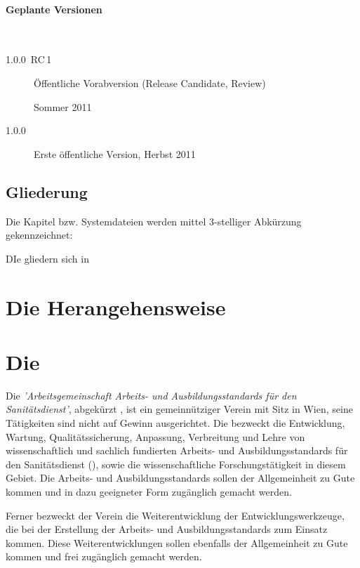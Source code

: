\documentclass[
ngerman,
paper=a4,
asymmetric,
fontsize=10pt,
draft=false,
numbers=noenddot,
bibtotocnumbered,
footnotes=multiple,
toc=flat,
]{scrbook}
\begin{document}
\paragraph{Geplante Versionen}~

\begin{description}
    \item[1.0.0~RC\,1] Öffentliche Vorabversion (Release
    Candidate, Review)
    
    Sommer 2011
    \item[1.0.0] Erste öffentliche Version, Herbst 2011
\end{description}

\subsection{Gliederung}
Die Kapitel bzw. Systemdateien werden mittel 3-stelliger
Abkürzung gekennzeichnet:

DIe {\AASS} gliedern sich in 



\section{Die Herangehensweise}



\section{Die \ARGE}



Die \emph{'Arbeitsgemeinschaft Arbeits- und
    Ausbildungsstandards für den Sanitätsdienst'}, abgekürzt {\ARGE},
    ist ein gemeinnütziger Verein mit Sitz in Wien, seine Tätigkeiten sind nicht
    auf Gewinn ausgerichtet. 
    Die \ARGE{} bezweckt die Entwicklung, Wartung,
    Qualitätssicherung, Anpassung, Verbreitung und Lehre von wissenschaftlich und sachlich fundierten Arbeits- und
    Ausbildungsstandards für den Sanitätsdienst (\AASS{}), sowie
    die wissenschaftliche Forschungstätigkeit in diesem
    Gebiet. Die Arbeits- und Ausbildungsstandards sollen der
    Allgemeinheit zu Gute kommen und in dazu geeigneter Form
    zugänglich gemacht werden.
    
    Ferner bezweckt der Verein die Weiterentwicklung
    der Entwicklungswerkzeuge, die bei der Erstellung der
    Arbeits- und Ausbildungsstandards zum Einsatz kommen.
    Diese Weiterentwicklungen sollen ebenfalls der
    Allgemeinheit zu Gute kommen und frei zugänglich gemacht
    werden.
        
\end{document}
